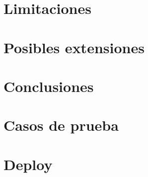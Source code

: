 \documentclass[11pt,a4paper,titlepage]{article}
\begin{document}
\section{Limitaciones}

\section{Posibles extensiones}

\section{Conclusiones}

\section{Casos de prueba}

\section{Deploy}
\end{document}
